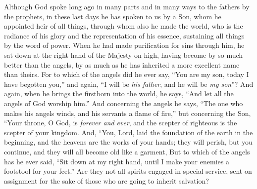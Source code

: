 
\begin{biblechapter} %
 Although God spoke long ago in many parts and in many ways to the fathers by the prophets,
\verse in these last days he has spoken to us by a Son, whom he appointed heir of all things, through whom also he made the world,
\verse who is the radiance of his glory and the representation of his essence, sustaining all things by the word of power. When he had made purification for sins through him, he sat down at the right hand of the Majesty on high,
\verse having become by so much better than the angels, by as much as he has inherited a more excellent name than theirs.
 For to which of the angels did he ever say, “You are my son, 
today I have begotten you,” and again, “I will be \textit{his father}, 
and he will be \textit{my son}”?
\verse And again, when he brings the firstborn into the world, he says, “And let all the angels of God worship him.”
\verse And concerning the angels he says, “The one who makes his angels winds, 
and his servants a flame of fire,”
\verse but concerning the Son,
\verse “Your throne, O God, is \textit{forever and ever}, 
and the scepter of righteous is the scepter of your kingdom.
\verse And,
\verse “You, Lord, laid the foundation of the earth in the beginning, 
and the heavens are the works of your hands;
\verse they will perish, but you continue, 
and they will all become old like a garment,
\verse But to which of the angels has he ever said, “Sit down at my right hand, 
until I make your enemies a footstool for your feet.”
\verse Are they not all spirits engaged in special service, sent on assignment for the sake of those who are going to inherit salvation?
\end{biblechapter}

